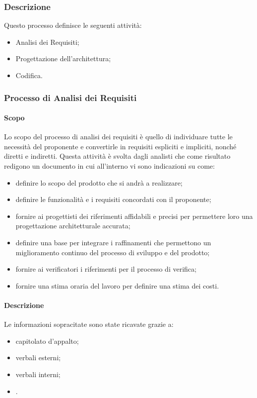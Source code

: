 \subsubsection{Descrizione}
Questo processo definisce le seguenti attività:
\begin{itemize}
  \item Analisi dei Requisiti;
  \item Progettazione dell'architettura;
  \item Codifica.
\end{itemize}
\subsubsection{Processo di Analisi dei Requisiti}
\label{_processoAnalisiDeiRequisiti}
\paragraph{Scopo}
Lo scopo del processo di analisi dei requisiti è quello di individuare tutte le necessità del proponente e convertirle in requisiti espliciti e impliciti, nonché diretti e indiretti. Questa attività è svolta dagli analisti che come risultato redigono un documento in cui all'interno vi sono indicazioni su come:
\begin{itemize}
  \item definire lo scopo del prodotto che si andrà a realizzare;
  \item definire le funzionalità e i requisiti concordati con il proponente;
  \item fornire ai progettisti dei riferimenti affidabili e precisi per permettere loro una progettazione architetturale accurata;
  \item definire una base per integrare i raffinamenti che permettono un miglioramento continuo del processo di sviluppo e del prodotto;
  \item fornire ai verificatori i riferimenti per il processo di verifica;
  \item fornire una stima oraria del lavoro per definire una stima dei costi.
\end{itemize}

\paragraph{Descrizione}
Le informazioni sopracitate sono state ricavate grazie a:
\begin{itemize}
  \item capitolato d'appalto;
  \item verbali esterni;
  \item verbali interni;
  \item {}.
\end{itemize}

